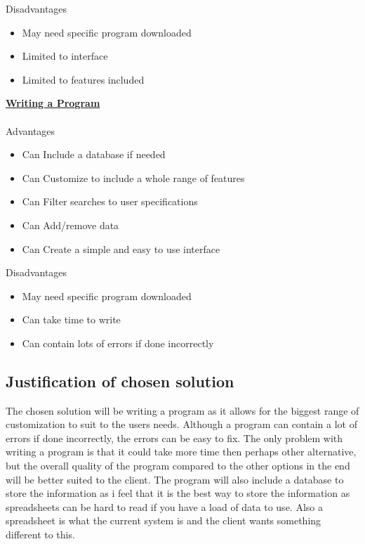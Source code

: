 {Disadvantages}
\begin{itemize}
	\item May need specific program downloaded
	\item Limited to interface
	\item Limited to features included
\end{itemize}
\textbf{\underline{Writing a Program}}
\\
\\
{Advantages}
\begin{itemize}
	\item Can Include a database if needed
	\item Can Customize to include a whole range of features
	\item Can Filter searches to user specifications 
	\item Can Add/remove data
	\item Can Create a simple and easy to use interface
\end{itemize}
{Disadvantages}
\begin{itemize}
	\item May need specific program downloaded
	\item Can take time to write
	\item Can contain lots of errors if done incorrectly
\end{itemize}
\subsection{Justification of chosen solution}
The chosen solution will be writing a program as it allows for the biggest range of customization  to suit to the users needs. Although a program can contain a lot of errors if done incorrectly, the errors can be easy to fix. The only problem with writing a program is that it could take more time then perhaps other alternative, but the overall quality of the program compared to the other options in the end will be better suited to the client. The program will also include a database to store the information as i feel that it is the best way to store the information as spreadsheets  can be hard to read if you have a load of data to use. Also a spreadsheet is what the current system is and the client wants something different to this.